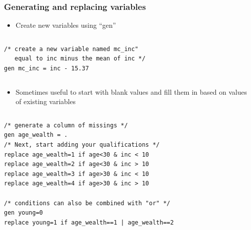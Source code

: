 \documentclass[table]{beamer}
\begin{document}
\begin{frame}[fragile]
\frametitle{Generating and replacing variables}
\label{sec-4-5}

\begin{itemize}
\item Create new variables using ``gen''
\end{itemize}
\vspace{-.5em} \begin{columns}  \begin{block}{}

\begin{verbatim}
/* create a new variable named mc_inc"
   equal to inc minus the mean of inc */
gen mc_inc = inc - 15.37
\end{verbatim}
\end{block} \end{columns}

\begin{itemize}
\item Sometimes useful to start with blank values and fill them in based on values of existing variables
\end{itemize}

\vspace{-.5em} \begin{columns}  \begin{block}{}

\begin{verbatim}
/* generate a column of missings */ 
gen age_wealth = .
/* Next, start adding your qualifications */
replace age_wealth=1 if age<30 & inc < 10
replace age_wealth=2 if age<30 & inc > 10
replace age_wealth=3 if age>30 & inc < 10
replace age_wealth=4 if age>30 & inc > 10

/* conditions can also be combined with "or" */
gen young=0
replace young=1 if age_wealth==1 | age_wealth==2
\end{verbatim}
\end{block} \end{columns}
\end{frame}
\end{document}
